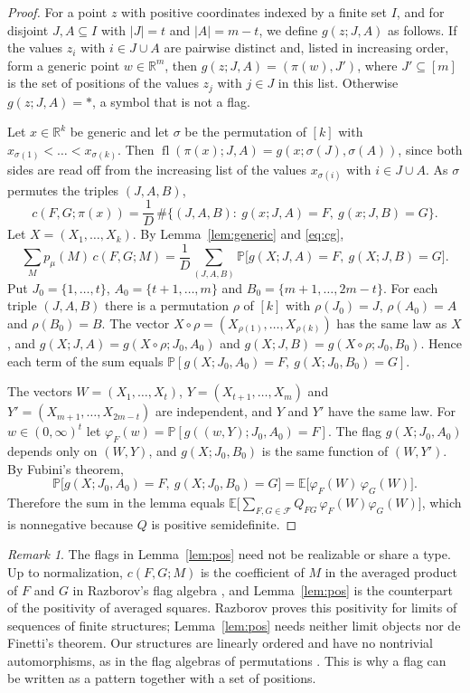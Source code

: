\documentclass[11pt]{amsart}
\theoremstyle{definition}
\theoremstyle{remark}
\newtheorem{remark}[theorem]{Remark}
\numberwithin{equation}{section}
\newcommand{\R}{\mathbb{R}}
\newcommand{\Prob}{\mathbb{P}}
\newcommand{\E}{\mathbb{E}}
\newcommand{\cF}{\mathcal{F}}
\newcommand{\fl}{\operatorname{fl}}
\begin{document}
\begin{proof}
For a point $z$ with positive coordinates indexed by a finite set $I$, and for disjoint $J,A\subseteq I$ with $|J|=t$ and $|A|=m-t$, we define $g(z;J,A)$ as follows. If the values $z_i$ with $i\in J\cup A$ are pairwise distinct and, listed in increasing order, form a generic point $w\in\R^m$, then $g(z;J,A)=(\pi(w),J')$, where $J'\subseteq[m]$ is the set of positions of the values $z_j$ with $j\in J$ in this list. Otherwise $g(z;J,A)=\ast$, a symbol that is not a flag.

Let $x\in\R^k$ be generic and let $\sigma$ be the permutation of $[k]$ with $x_{\sigma(1)}<\dots<x_{\sigma(k)}$. Then $\fl(\pi(x);J,A)=g(x;\sigma(J),\sigma(A))$, since both sides are read off from the increasing list of the values $x_{\sigma(i)}$ with $i\in J\cup A$. As $\sigma$ permutes the triples $(J,A,B)$,
\begin{equation}\label{eq:cg}
c(F,G;\pi(x))=\frac1D\,\#\bigl\{(J,A,B):\ g(x;J,A)=F,\ g(x;J,B)=G\bigr\}.
\end{equation}
Let $X=(X_1,\dots,X_k)$. By Lemma~\ref{lem:generic} and \eqref{eq:cg},
\[
\sum_Mp_\mu(M)\,c(F,G;M)=\frac1D\sum_{(J,A,B)}\Prob\bigl[g(X;J,A)=F,\ g(X;J,B)=G\bigr].
\]
Put $J_0=\{1,\dots,t\}$, $A_0=\{t+1,\dots,m\}$ and $B_0=\{m+1,\dots,2m-t\}$. For each triple $(J,A,B)$ there is a permutation $\rho$ of $[k]$ with $\rho(J_0)=J$, $\rho(A_0)=A$ and $\rho(B_0)=B$. The vector $X\circ\rho=(X_{\rho(1)},\dots,X_{\rho(k)})$ has the same law as $X$, and $g(X;J,A)=g(X\circ\rho;J_0,A_0)$ and $g(X;J,B)=g(X\circ\rho;J_0,B_0)$. Hence each term of the sum equals $\Prob[g(X;J_0,A_0)=F,\ g(X;J_0,B_0)=G]$.

The vectors $W=(X_1,\dots,X_t)$, $Y=(X_{t+1},\dots,X_m)$ and $Y'=(X_{m+1},\dots,X_{2m-t})$ are independent, and $Y$ and $Y'$ have the same law. For $w\in(0,\infty)^t$ let $\varphi_F(w)=\Prob[g((w,Y);J_0,A_0)=F]$. The flag $g(X;J_0,A_0)$ depends only on $(W,Y)$, and $g(X;J_0,B_0)$ is the same function of $(W,Y')$. By Fubini's theorem,
\[
\Prob\bigl[g(X;J_0,A_0)=F,\ g(X;J_0,B_0)=G\bigr]=\E\bigl[\varphi_F(W)\,\varphi_G(W)\bigr].
\]
Therefore the sum in the lemma equals $\E\bigl[\sum_{F,G\in\cF}Q_{FG}\,\varphi_F(W)\varphi_G(W)\bigr]$, which is nonnegative because $Q$ is positive semidefinite.
\end{proof}

\begin{remark}\label{rem:flags}
The flags in Lemma~\ref{lem:pos} need not be realizable or share a type. Up to normalization, $c(F,G;M)$ is the coefficient of $M$ in the averaged product of $F$ and $G$ in Razborov's flag algebra \cite{Raz07}, and Lemma~\ref{lem:pos} is the counterpart of the positivity of averaged squares. Razborov proves this positivity for limits of sequences of finite structures; Lemma~\ref{lem:pos} needs neither limit objects nor de Finetti's theorem. Our structures are linearly ordered and have no nontrivial automorphisms, as in the flag algebras of permutations \cite{BHLPUV15,SS18}. This is why a flag can be written as a pattern together with a set of positions.
\end{remark}
\end{document}
